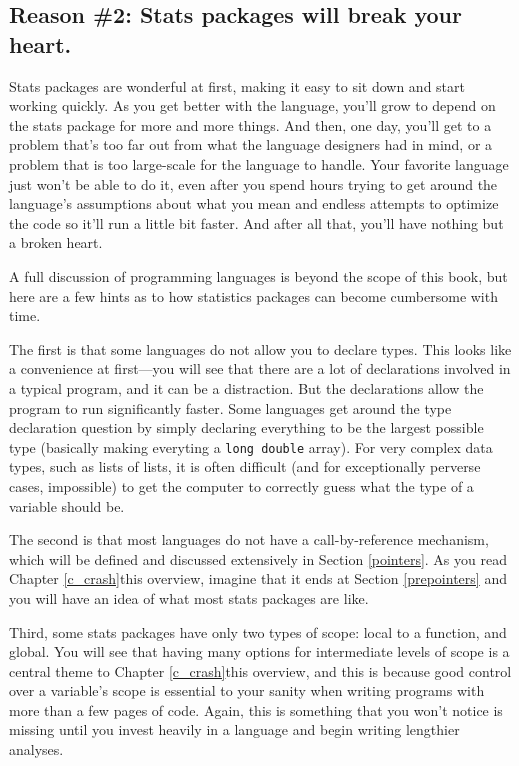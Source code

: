 \subsection{Reason \#2: Stats packages will break your heart.} Stats packages
are wonderful at first, making it easy to sit down and start working
quickly. As you get better with the language, you'll 
grow to depend on the stats package for more and more
things. And then, one day, you'll get to a problem that's too far
out from what the language designers had in mind, or a problem that is
too large-scale for the language to handle. Your favorite language just
won't be able to do it, even after you spend hours trying to get around
the language's assumptions about what you mean and endless attempts to
optimize the code so it'll run a little bit faster. And after all that,
you'll have nothing but a broken heart.

A full discussion of programming languages is beyond the scope of this book, but
here are a few hints as to how statistics packages can become cumbersome with
time. 

The first is that some languages do not allow you to declare types. This
looks like a convenience at first---you will see that there are a
lot of declarations involved in a typical program, and it can be a
distraction. But the declarations allow the program to run significantly
faster. Some languages get around the type declaration question by simply
declaring everything to be the largest possible type (basically making
everyting a {\tt long double} array).  For very complex data types,
such as lists of lists, it is often difficult (and for exceptionally
perverse cases, impossible) to get the computer to correctly guess what the
type of a variable should be.

The second is that most languages do not have a call-by-reference
mechanism, which will be defined and discussed extensively in Section
\ref{pointers}. As you read \ifbook Chapter \ref{c_crash}\else this overview\fi, imagine that it ends
at Section \ref{prepointers} and you will have an idea of what most
stats packages are like.

Third, some stats packages have only two types of scope: local to
a function, and global. You will see that having many options for
intermediate levels of scope is a central theme to \ifbook Chapter \ref{c_crash}\else this overview\fi,
and this is because good control over a variable's scope is essential
to your sanity when writing programs with more than a few pages of
code. Again, this is something that you won't notice is missing until
you invest heavily in a language and begin writing lengthier analyses.

